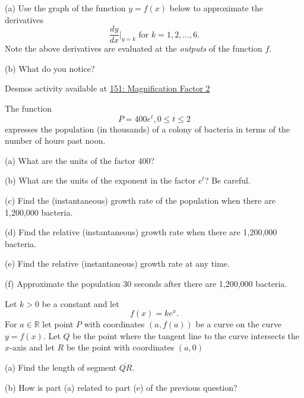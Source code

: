 \documentclass{ximera}
\begin{document}
\begin{exploration}

(a) Use the graph of the function $y=f(x)$ below to approximate the derivatives 
\[
    \frac{dy}{dx}\Big|_{y=k} \text{ for } k=1, 2, \ldots , 6.
\]
Note the above derivatives are evaluated at the \emph{outputs} of the function $f$. 

(b) What do  you notice?

\begin{onlineOnly}
    \begin{center}
\end{center}
\end{onlineOnly}


Desmos activity available at \href{https://www.desmos.com/calculator/k08dphtuca}{151: Magnification Factor 2}


\end{exploration}

\begin{question}  \label{Qdefrt4trt}
The function 
\[
    P = 400 e^t , 0\leq t \leq 2
\]
expresses the population (in thousands) of a colony of bacteria in terms of the number of hours past noon.

(a) What are the units of the factor $400$?

(b) What are the units of the exponent in the factor $e^t$? Be careful.

(c) Find the (instantaneous) growth rate of the population when there are 1,200,000 bacteria.

(d) Find the relative (instantaneous) growth rate when there are 1,200,000 bacteria.

(e) Find the  relative (instantaneous) growth rate at any time.

(f) Approximate the population $30$ seconds after there are 1,200,000 bacteria.
\end{question}


\begin{question}  \label{Qdfdsf4thn}
Let $k>0$ be a constant and let
\[
     f(x) = k e^x .
\]
For $a\in \mathbb{R}$ let point $P$ with coordinates $(a, f(a))$ be a curve on the curve $y=f(x)$. Let $Q$ be the point where the tangent line to the curve intersects the $x$-axis and let $R$ be the point with coordinates $(a,0)$

(a) Find the length of segment $\overline{QR}$.

(b) How is part (a) related to part (e) of the previous question?

\end{question}
\end{document}
